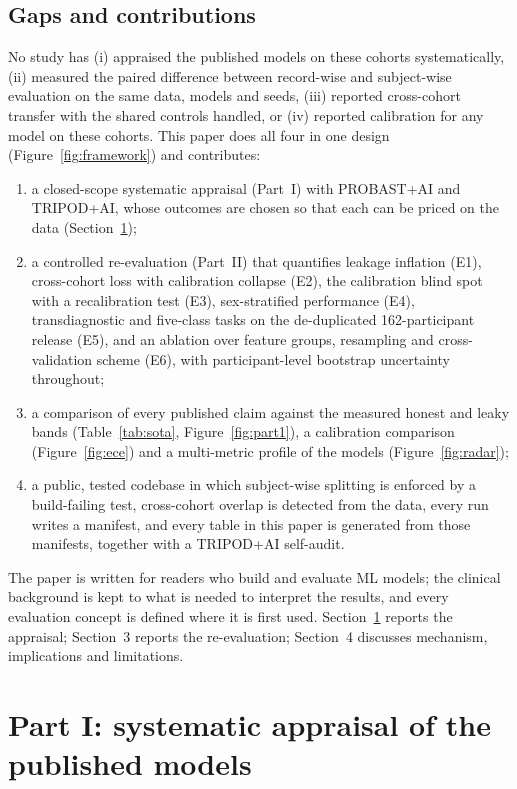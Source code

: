 \documentclass[11pt,a4paper]{article}
\begin{document}
\subsection{Gaps and contributions}
No study has (i) appraised the published models on these cohorts systematically, (ii) measured the
paired difference between record-wise and subject-wise evaluation on the same data, models and
seeds, (iii) reported cross-cohort transfer with the shared controls handled, or (iv) reported
calibration for any model on these cohorts. This paper does all four in one design
(Figure~\ref{fig:framework}) and contributes:
\begin{enumerate}[nosep]
\item a closed-scope systematic appraisal (Part~I) with PROBAST+AI and TRIPOD+AI, whose outcomes
are chosen so that each can be priced on the data (Section~\ref{sec:part1});
\item a controlled re-evaluation (Part~II) that quantifies leakage inflation (E1), cross-cohort
loss with calibration collapse (E2), the calibration blind spot with a recalibration test (E3),
sex-stratified performance (E4), transdiagnostic and five-class tasks on the de-duplicated
162-participant release (E5), and an ablation over feature groups, resampling and
cross-validation scheme (E6), with participant-level bootstrap uncertainty throughout;
\item a comparison of every published claim against the measured honest and leaky bands
(Table~\ref{tab:sota}, Figure~\ref{fig:part1}), a calibration comparison (Figure~\ref{fig:ece})
and a multi-metric profile of the models (Figure~\ref{fig:radar});
\item a public, tested codebase in which subject-wise splitting is enforced by a build-failing
test, cross-cohort overlap is detected from the data, every run writes a manifest, and every table
in this paper is generated from those manifests, together with a TRIPOD+AI self-audit.
\end{enumerate}
The paper is written for readers who build and evaluate ML models; the clinical background is kept
to what is needed to interpret the results, and every evaluation concept is defined where it is
first used. Section~\ref{sec:part1} reports the appraisal; Section~3 reports the re-evaluation;
Section~4 discusses mechanism, implications and limitations.



\section{Part I: systematic appraisal of the published models}\label{sec:part1}
\end{document}
